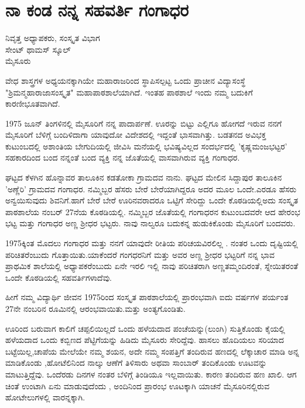 {\fontsize{14}{16}\selectfont
\chapter{ನಾ ಕಂಡ ನನ್ನ ಸಹವರ್ತಿ ಗಂಗಾಧರ}

\begin{center}

ನಿವೃತ್ತ ಅಧ್ಯಾಪಕರು, ಸಂಸ್ಕೃತ ವಿಭಾಗ\\
ಸೇಂಟ್ ಥಾಮಸ್ ಸ್ಕೂಲ್\\
ಮೈಸೂರು
\addrule
\end{center}

ವೇಧ  \enginline{-}  ಶಾಸ್ತ್ರಗಳ ಅಧ್ಯಯನಕ್ಕಾಗಿಯೇ ಮಹಾರಾಜರಿಂದ ಸ್ಥಾಪಿಸಲ್ಪಟ್ಟ ಒಂದು ಪ್ರಾಚೀನ ವಿದ್ಯಾಸಂಸ್ಥೆ   "ಶ್ರಿಮನ್ಮಹಾರಾಜಾಸಂಸ್ಕೃತ" ಮಹಾಪಾಠಶಾಲೆಯಾಗಿದೆ.  ಇಂತಹ ಪಾಠಶಾಲೆ ಇಂದು ನಮ್ಮ ಬದುಕಿಗೆ ಕಾರಣೀಭೂತವಾಗಿದೆ. 

1975 ಜೂನ್ ತಿಂಗಳಿನಲ್ಲಿ ಮೈಸೂರಿಗೆ ನನ್ನ ಪಾದಾರ್ಪಣೆ. ಊರನ್ನು ಬಿಟ್ಟು ಎಲ್ಲಿಗೂ ಹೋಗದೆ ಇರುವ ನನಗೆ ಮೈಸೂರಿಗೆ ಬೆಳಿಗ್ಗೆ ಬಂದಿಳಿದಾಗಾ ಯಾವುದೋ ವಿದೇಶದಲ್ಲಿ ಇದ್ದಂತೆ ಭಾಸವಾಗಿತ್ತು. ಬಡತನದ ಅವಿಭಕ್ತ ಕುಟುಂಬದಲ್ಲಿ  ಅಶಾಂತಿಯ ಬೇಗುದಿಯಲ್ಲಿ ಜೀವಿಸಿ ಮನೆಯಲ್ಲಿ ಭವಿಷ್ಯವಿಲ್ಲದ ಸಂದರ್ಭದಲ್ಲಿ 'ಕೃಷ್ಣಮಂಜಭಟ್ಟರ' ಸಹಕಾರದಿಂದ ಬಂದ ನನ್ನಂತೆ  ಬಂದ ವ್ಯಕ್ತಿ ನನ್ನ ಜೊತೆಯಲ್ಲಿ ವಾಸವಾಗಿರುವ ವ್ಯಕ್ತಿ ಗಂಗಾಧರ.

ಘಟ್ಟದ ಕೆಳಗಿನ ಹೊನ್ನಾವರ ತಾಲೂಕಿನ ಕಡತೋಕಾ ಗ್ರಾಮದವ ನಾನು. ಘಟ್ಟದ ಮೇಲಿನ ಸಿದ್ದಾಪುರ ತಾಲೂಕಿನ 'ಅಣ್ಣೆರಿ' ಗ್ರಾಮದವ ಗಂಗಾಧರ. ನಮ್ಮಿಬ್ಬರ ಹೆಸರು ಬೇರೆ  \enginline{-}   ಬೇರೆಯಾಗಿದ್ದರೂ ಅದರ ಮೂಲ ಒಂದೇ.ಎರಡೂ ಹೆಸರು   ಅನ್ವಯಿಸುವುದು ಶಿವನಿಗೆ.ಹಾಗೆ ಬೇರೆ  \enginline{-}  ಬೇರೆ  ಊರಿನವರಾದರೂ ಒಟ್ಟಿಗೆ ಸೇರಿದ್ದು ಒಂದೇ ಕೊಠಡಿಯಲ್ಲಿಅದು ಸಂಸ್ಕೃತ ಪಾಠಶಾಲೆಯ  ನಂಬರ್ 27ನೆಯ ಕೊಠಡಿಯಲ್ಲಿ. ನಮ್ಮಿಬ್ಬರ ಜೊತೆಯಲ್ಲಿ ಗಂಗಾಧರನ ಕುಟುಂಬದವರೇ ಆದ ಹೇರಂಭ ಭಟ್ಟ ಮತ್ತು ಗಂಗಾಧರ ಅಣ್ಣ ಶ್ರೀಧರ ಭಟ್ಟರು. ನಾವು ನಾಲ್ವರೂ ಬದುಕನ್ನ ಹುಡುಕಿಕೊಂಡು ಮೈಸೂರಿಗೆ ಬಂದವರು. 

1975ಕ್ಕಿಂತ  ಮೊದಲು ಗಂಗಾಧರ ಮತ್ತು ನನಗೆ ಯಾವುದೇ ರೀತಿಯ ಪರಿಚಯವಿರಲಿಲ್ಲ . ನಂತರ ಒಂದು ದೃಷ್ಟಿಯಲ್ಲಿ ಪರಿಚಿತರೆಂಬುದು ಗೊತ್ತಾಯಿತು.ಯಾಕೆಂದರೆ  ಗಂಗಧರನಿಗೆ ಮತ್ತು ಅವರ ಅಣ್ಣ ಶ್ರೀಧರ ಭಟ್ಟರಿಗೆ  ನನ್ನ ಭಾವ ಪ್ರಾಥಮಿಕ ಶಾಲೆಯಲ್ಲಿ ಅಧ್ಯಾಪಕರೆಂಬುದು  ಏನೇ ಇರಲಿ ಇಲ್ಲಿ ನಾವು ಪರಿಚಿತರಾಗಿ ಅಣ್ಣತಮ್ಮಂದಿರಂತೆ, ಸ್ನೇಯಿತರಂತೆ ಒಂದೇ ಕೊಠಡಿಯಲ್ಲಿ ಸಹವರ್ತಿಗಳಾದೆವು. 

ಹೀಗೆ ನಮ್ಮ ವಿದ್ಯಾರ್ಥಿ ಜೀವನ 1975ರಿಂದ ಸಂಸ್ಕೃತ ಪಾಠಶಾಲೆಯಲ್ಲಿ ಪ್ರಾರಂಭವಾಗಿ ಐದು ವರ್ಷಗಳ ಪರ್ಯಂತ 27ನೇ ನಂಬರಿನ ರೂಮಿನಲ್ಲಿ ಆರಂಭವಾಯಿತು.ಮತ್ತು ಅಂತ್ಯಗೊಂಡಿತು. 

ಊರಿಂದ ಬರುವಾಗ ಕಾಲಿಗೆ ಚಪ್ಪಲಿಯಿಲ್ಲದೆ ಒಂದು ಹಳೆಯದಾದ ಪಂಚೆಯನ್ನು(ಲುಂಗಿ) ಸುತ್ತಿಕೊಂಡು ಕೈಯಲ್ಲಿ ಹಳೆಯದಾದ ಒಂದು ಕಬ್ಬಿಣದ ಪೆಟ್ಟಿಗೆಯನ್ನು ಹಿಡಿದು ಮೈಸೂರು ಸೇರಿದ್ದೆವು. ಹಾಸಲು  \enginline{-}   ಹೊದಿಯಲು ಸರಿಯಾದ ಬಟ್ಟೆಯಿಲ್ಲ,ಚಾಪೆಯ ಮೇಲೆಯೇ ನಮ್ಮ ಶಯನ, ಅದೇ ನಮ್ಮ ಸಂಪತ್ತಿಗೆ ತಂದಿರುವ ಹಣದಲ್ಲಿ ಲೆಕ್ಕಾಚಾರ ಮಾಡಿ ಅನ್ನ ಮಾಡಿಕೊಂಡು ,ಹೋಟೆಲಿನಿಂದ ನಾಲ್ಕು ಆಣೆಗೆ ತಿಳಿಸಾರು  ಅಥವಾ ಸಾಂಬಾರ್ ತಂದಿಕೊಂಡು ಊಟವನ್ನು ಮಾಟುತ್ತಿದ್ದೆವು. ಒಂದೆರಡು ದಿನಗಳ ನಂತರ ಬೆಳಿಗ್ಗೆ ತಿಂಡಿಯೂ ಇಲ್ಲವಾಯಿತು. ಕಾರಣ ತಂದಿರುವ ಹಣ ಖಾಲಿ. ಆಗ ಚಿಂತೆ ಉಂಟಾಗಿ ಏನು ಮಾಡುವುದೆಂದು , ಅಂದಿನಿಂದ ಪ್ರಾರಂಭ ಊಟಕ್ಕಾಗಿ ಯಾಚನೆ  \enginline{-}   ಮೈಸೂರಿನಲ್ಲಿರುವ ಹೋಟೇಲುಗಳಲ್ಲಿ ವಾರನ್ನಕ್ಕಾಗಿ.

}
